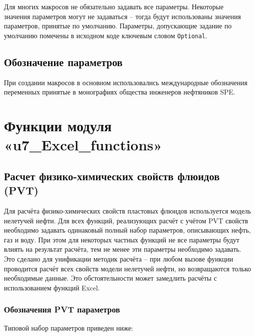 \documentclass[]{scrreprt}
\begin{document}
Для многих макросов не обязательно задавать все параметры. Некоторые значения параметров могут не задаваться – тогда будут использованы значения параметров, принятые по умолчанию. Параметры, допускающие задание по умолчанию помечены в исходном коде ключевым словом \texttt{Optional}.

\section{Обозначение параметров}
При создании макросов в основном использовались международные обозначения переменных принятые в монографиях общества инженеров нефтяников SPE.

\chapter{Функции модуля «u7\_Excel\_functions»}
\section{Расчет физико-химических свойств флюидов (PVT)}
Для расчёта физико-химических свойств пластовых флюидов используется модель нелетучей нефти. Для всех функций, реализующих расчёт с учётом PVT свойств необходимо задавать одинаковый полный набор параметров, описывающих нефть, газ и воду.  При этом для некоторых частных функций не все параметры будут влиять на результат расчёта, тем не менее эти параметры необходимо задавать. Это сделано для унификации методик расчёта – при любом вызове функции проводится расчёт всех свойств модели нелетучей нефти, но возвращаются только необходимые данные. Это обстоятельности может замедлить расчёты с использованием функций Excel.
 
\subsection{Обозначения PVT параметров}
Типовой набор параметров приведен ниже:

\end{document}
